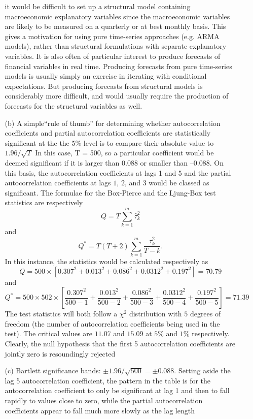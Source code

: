 \documentclass[11pt,a4paper]{article}
\begin{document}
\begin{itemize}
\begin{itemize}
it would be difficult to set up a structural model containing macroeconomic
explanatory variables since the macroeconomic variables are likely to be
measured on a quarterly or at best monthly basis. This gives a motivation for
using pure time-series approaches (e.g. ARMA models), rather than structural
formulations with separate explanatory variables.
It is also often of particular interest to produce forecasts of financial
variables in real time. Producing forecasts from pure time-series models is
usually simply an exercise in iterating with conditional expectations. But
producing forecasts from structural models is considerably more difficult, and
would usually require the production of forecasts for the structural variables
as well.
\item[(b)]  A simple``rule of thumb'' for determining whether autocorrelation
coefficients and partial autocorrelation coefficients are statistically
significant at the the 5\% level is to compare their absolute value to $1.96/\sqrt{T}$
In this case, T = 500,
so a particular coefficient would be deemed significant if it is larger than
$0.088$ or smaller than $–0.088$. On this basis, the autocorrelation
coefficients at lags 1 and 5 and the partial autocorrelation coefficients at
lags $1$, $2$, and $3$ would be classed as significant. The formulae for the
Box-Pierce and the Ljung-Box test statistics are respectively
$$
Q = T \sum_{k=1}^m \hat \tau_k^2
$$
and
$$
Q^* = T(T+2) \sum_{k=1}^m \frac{\hat \tau_k^2}{T-k}.
$$
In this instance, the statistics would be calculated respectively as
$$
Q = 500 × \left[0.307^2 + 0.013^2 + 0.086^2 + 0.0312^2 + 0.197^2\right] = 70.79
$$
and
$$
Q^* = 500\times 502 \times \left[\frac{0.307^2}{500-1} + \frac{0.013^2}{500-2} + \frac{0.086^2}{500-3} + \frac{0.0312^2}{500-4} + \frac{0.197^2}{500-5}\right] = 71.39
$$
The test statistics will both follow a $\chi^2$ distribution with $5$ degrees
of freedom (the number of autocorrelation coefficients being used in the test).
 The critical values are $11.07$ and $15.09$ at $5\%$ and $1\%$ respectively.
Clearly,
the null hypothesis that the first 5 autocorrelation coefficients are jointly
zero is resoundingly rejected
\item[(c)] Bartlett significance bands: $\pm 1.96/\sqrt{500} = \pm 0.088$. Setting aside the lag 5 autocorrelation coefficient, the pattern in
the table is for the autocorrelation coefficient to only be significant at lag
1 and then to fall rapidly to values close to zero, while the partial
autocorrelation coefficients appear to fall much more slowly as the lag length

\end{itemize}
\end{itemize}
\end{document}
